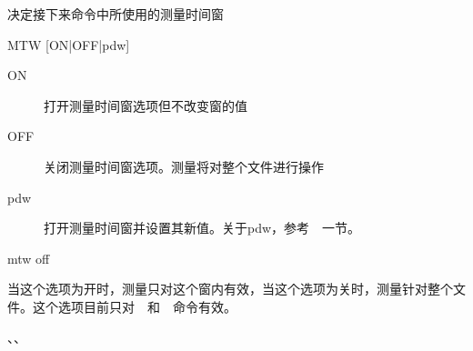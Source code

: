 \label{cmd:mtw}

决定接下来命令中所使用的测量时间窗

\begin{SACSTX}
MTW [ON|OFF|pdw]
\end{SACSTX}

\begin{description}
\item [ON] 打开测量时间窗选项但不改变窗的值
\item [OFF] 关闭测量时间窗选项。测量将对整个文件进行操作
\item [pdw] 打开测量时间窗并设置其新值。关于pdw，参考~~一节。
\end{description}

\begin{SACDFT}
mtw off
\end{SACDFT}

当这个选项为开时，测量只对这个窗内有效，当这个选项为关时，测量针对整个文件。这个选项目前只对~~和~~命令有效。

、、
